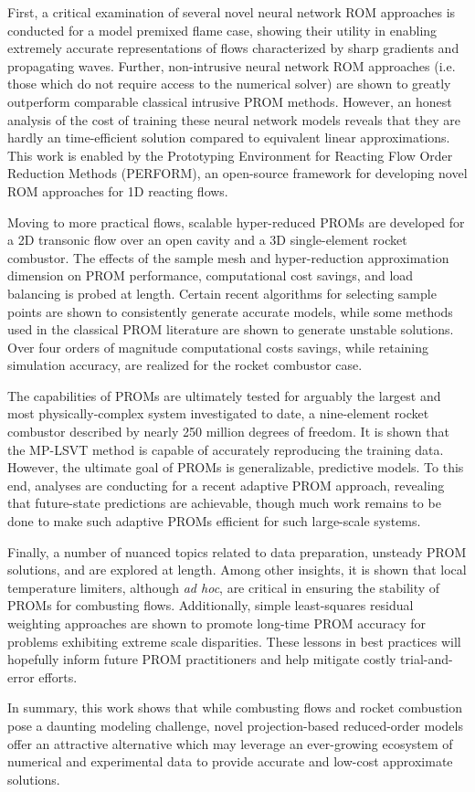 First, a critical examination of several novel neural network ROM approaches is conducted for a model premixed flame case, showing their utility in enabling extremely accurate representations of flows characterized by sharp gradients and propagating waves. Further, non-intrusive neural network ROM approaches (i.e. those which do not require access to the numerical solver) are shown to greatly outperform comparable classical intrusive PROM methods. However, an honest analysis of the cost of training these neural network models reveals that they are hardly an time-efficient solution compared to equivalent linear approximations. This work is enabled by the Prototyping Environment for Reacting Flow Order Reduction Methods (PERFORM), an open-source framework for developing novel ROM approaches for 1D reacting flows.

Moving to more practical flows, scalable hyper-reduced PROMs are developed for a 2D transonic flow over an open cavity and a 3D single-element rocket combustor. The effects of the sample mesh and hyper-reduction approximation dimension on PROM performance, computational cost savings, and load balancing is probed at length. Certain recent algorithms for selecting sample points are shown to consistently generate accurate models, while some methods used in the classical PROM literature are shown to generate unstable solutions. Over four orders of magnitude computational costs savings, while retaining simulation accuracy, are realized for the rocket combustor case.

The capabilities of PROMs are ultimately tested for arguably the largest and most physically-complex system investigated to date, a nine-element rocket combustor described by nearly 250 million degrees of freedom. It is shown that the MP-LSVT method is capable of accurately reproducing the training data. However, the ultimate goal of PROMs is generalizable, predictive models. To this end, analyses are conducting for a recent adaptive PROM approach, revealing that future-state predictions are achievable, though much work remains to be done to make such adaptive PROMs efficient for such large-scale systems.

Finally, a number of nuanced topics related to data preparation, unsteady PROM solutions, and are explored at length. Among other insights, it is shown that local temperature limiters, although \textit{ad hoc}, are critical in ensuring the stability of PROMs for combusting flows. Additionally, simple least-squares residual weighting approaches are shown to promote long-time PROM accuracy for problems exhibiting extreme scale disparities. These lessons in best practices will hopefully inform future PROM practitioners and help mitigate costly trial-and-error efforts.

In summary, this work shows that while combusting flows and rocket combustion pose a daunting modeling challenge, novel projection-based reduced-order models offer an attractive alternative which may leverage an ever-growing ecosystem of numerical and experimental data to provide accurate and low-cost approximate solutions.